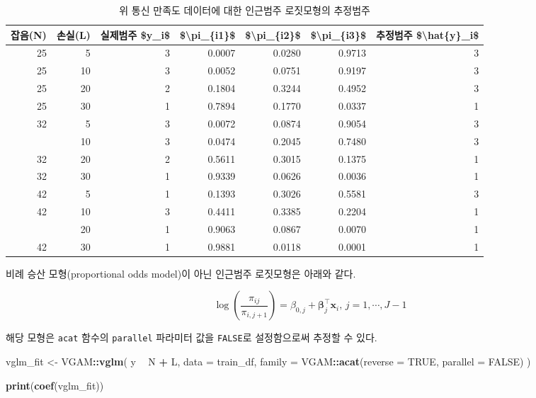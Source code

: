\documentclass[]{book}
\newenvironment{Shaded}{\begin{snugshade}}{\end{snugshade}}
\newcommand{\DataTypeTok}[1]{\textcolor[rgb]{0.13,0.29,0.53}{#1}}
\newcommand{\KeywordTok}[1]{\textcolor[rgb]{0.13,0.29,0.53}{\textbf{#1}}}
\newcommand{\NormalTok}[1]{#1}
\newcommand{\OperatorTok}[1]{\textcolor[rgb]{0.81,0.36,0.00}{\textbf{#1}}}
\newcommand{\OtherTok}[1]{\textcolor[rgb]{0.56,0.35,0.01}{#1}}
\newcommand{\StringTok}[1]{\textcolor[rgb]{0.31,0.60,0.02}{#1}}
\begin{document}
\begin{table}[t]

\caption{\label{tab:adjacent-category-logit-prediction}위 통신 만족도 데이터에 대한 인근범주 로짓모형의 추정범주}
\centering
\begin{tabular}{rrrrrrr}
\toprule
잡음(N) & 손실(L) & 실제범주 \$y\_i\$ & \$\textbackslash{}pi\_\{i1\}\$ & \$\textbackslash{}pi\_\{i2\}\$ & \$\textbackslash{}pi\_\{i3\}\$ & 추정범주 \$\textbackslash{}hat\{y\}\_i\$\\
\midrule
25 & 5 & 3 & 0.0007 & 0.0280 & 0.9713 & 3\\
25 & 10 & 3 & 0.0052 & 0.0751 & 0.9197 & 3\\
25 & 20 & 2 & 0.1804 & 0.3244 & 0.4952 & 3\\
25 & 30 & 1 & 0.7894 & 0.1770 & 0.0337 & 1\\
32 & 5 & 3 & 0.0072 & 0.0874 & 0.9054 & 3\\
\addlinespace
32 & 10 & 3 & 0.0474 & 0.2045 & 0.7480 & 3\\
32 & 20 & 2 & 0.5611 & 0.3015 & 0.1375 & 1\\
32 & 30 & 1 & 0.9339 & 0.0626 & 0.0036 & 1\\
42 & 5 & 1 & 0.1393 & 0.3026 & 0.5581 & 3\\
42 & 10 & 3 & 0.4411 & 0.3385 & 0.2204 & 1\\
\addlinespace
42 & 20 & 1 & 0.9063 & 0.0867 & 0.0070 & 1\\
42 & 30 & 1 & 0.9881 & 0.0118 & 0.0001 & 1\\
\bottomrule
\end{tabular}
\end{table}

비례 승산 모형(proportional odds model)이 아닌 인근범주 로짓모형은 아래와 같다.

\begin{equation}
\log \left( \frac{\pi_{ij}}{\pi_{i,j+1}} \right) = \beta_{0,j} + \boldsymbol\beta_j^\top \mathbf{x}_i, \, j = 1, \cdots, J - 1
\label{eq:adjacent-category-logit-nonproportional}
\end{equation}

해당 모형은 \texttt{acat} 함수의 \texttt{parallel} 파라미터 값을 \texttt{FALSE}로 설정함으로써 추정할 수 있다.

\begin{Shaded}
\begin{Highlighting}[]
\NormalTok{vglm_fit <-}\StringTok{ }\NormalTok{VGAM}\OperatorTok{::}\KeywordTok{vglm}\NormalTok{(}
\NormalTok{  y }\OperatorTok{~}\StringTok{ }\NormalTok{N }\OperatorTok{+}\StringTok{ }\NormalTok{L,}
  \DataTypeTok{data =}\NormalTok{ train_df,}
  \DataTypeTok{family =}\NormalTok{ VGAM}\OperatorTok{::}\KeywordTok{acat}\NormalTok{(}\DataTypeTok{reverse =} \OtherTok{TRUE}\NormalTok{, }\DataTypeTok{parallel =} \OtherTok{FALSE}\NormalTok{)}
\NormalTok{  )}

\KeywordTok{print}\NormalTok{(}\KeywordTok{coef}\NormalTok{(vglm_fit))}
\end{Highlighting}
\end{Shaded}
\end{document}
